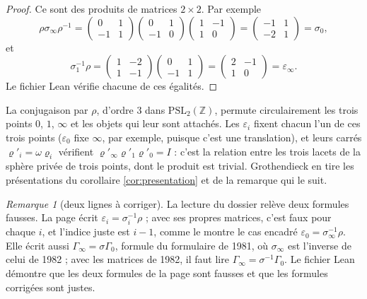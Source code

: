 \documentclass[11pt,a4paper]{article}
\theoremstyle{plain}
\theoremstyle{definition}
\theoremstyle{remark}
\newtheorem{remarque}[theoreme]{Remarque}
\newcommand{\Z}{\mathbb{Z}}
\newcommand{\PSL}{\mathrm{PSL}}
\begin{document}
\begin{proof}
Ce sont des produits de matrices $2\times2$. Par exemple
\[
  \rho\sigma_\infty\rho^{-1}=\begin{pmatrix}0&1\\-1&1\end{pmatrix}\begin{pmatrix}0&1\\-1&0\end{pmatrix}\begin{pmatrix}1&-1\\1&0\end{pmatrix}=\begin{pmatrix}-1&1\\-2&1\end{pmatrix}=\sigma_0,
\]
et
\[
  \sigma_1^{-1}\rho=\begin{pmatrix}1&-2\\1&-1\end{pmatrix}\begin{pmatrix}0&1\\-1&1\end{pmatrix}=\begin{pmatrix}2&-1\\1&0\end{pmatrix}=\varepsilon_\infty .
\] Le fichier Lean vérifie chacune de ces égalités.
\end{proof}

La conjugaison par $\rho$, d'ordre $3$ dans $\PSL_2(\Z)$, permute circulairement les trois points $0$, $1$, $\infty$ et les objets qui leur sont attachés. Les $\varepsilon_i$ fixent chacun l'un de ces trois points ($\varepsilon_0$ fixe $\infty$, par exemple, puisque c'est une translation), et leurs carrés $\varrho'_i=\omega\varrho_i$ vérifient $\varrho'_\infty\varrho'_1\varrho'_0=I$ : c'est la relation entre les trois lacets de la sphère privée de trois points, dont le produit est trivial. Grothendieck en tire les présentations du corollaire \ref{cor:presentation} et de la remarque qui le suit.

\begin{remarque}[deux lignes à corriger]
La lecture du dossier relève deux formules fausses. La page écrit $\varepsilon_i=\sigma_i^{-1}\rho$ ; avec ses propres matrices, c'est faux pour chaque $i$, et l'indice juste est $i-1$, comme le montre le cas encadré $\varepsilon_0=\sigma_\infty^{-1}\rho$. Elle écrit aussi $\Gamma_\infty=\sigma\Gamma_0$, formule du formulaire de 1981, où $\sigma_\infty$ est l'inverse de celui de 1982 ; avec les matrices de 1982, il faut lire $\Gamma_\infty=\sigma^{-1}\Gamma_0$. Le fichier Lean démontre que les deux formules de la page sont fausses et que les formules corrigées sont justes.
\end{remarque}
\end{document}
